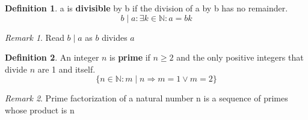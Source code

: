 \documentclass[11pt]{article}
\theoremstyle{plain}%
\theoremstyle{definition}
\newtheorem{defn}{Definition}
\theoremstyle{remark}
\newtheorem*{rem}{Remark}
\begin{document}
\begin{defn}
  \label{divisible}
  a is \textbf{divisible} by b if the division of a by b has no remainder.
  \[
    b \mid a: \exists k\in \mathbb{N}: a = bk
  \]
  \begin{rem}
    Read $b\mid a$ as $b$ divides $a$
  \end{rem}
\end{defn}

\begin{defn}
  \label{prime number}
  An integer $n$ is \textbf{prime} if $n \geq 2$ and the only positive integers that divide $n$ are 1 and itself.
  \[
    \{ n \in\mathbb{N}: m\mid n \Rightarrow m=1 \lor m=2\}
  \]
  \begin{rem}
    Prime factorization of a natural number n is a sequence of primes whose product is n
  \end{rem}
\end{defn}
\end{document}

